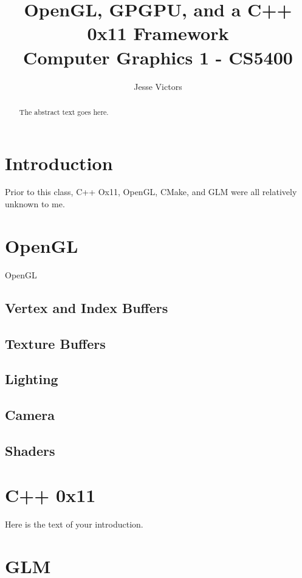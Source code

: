 \documentclass[journal]{IEEEtran}
\begin{document}
\title{OpenGL, GPGPU, and a C++ 0x11 Framework \\ \Large Computer Graphics 1 - CS5400}
\author{Jesse Victors}

\maketitle

\begin{abstract}
The abstract text goes here.
\end{abstract}

\section{Introduction}

Prior to this class, C++ Ox11, OpenGL, CMake, and GLM were all relatively unknown to me.

\section{OpenGL}

OpenGL

\subsection{Vertex and Index Buffers}

\subsection{Texture Buffers}

\subsection{Lighting}

\subsection{Camera}

\subsection{Shaders}

\section{C++ 0x11}
Here is the text of your introduction.

\section{GLM}
\end{document}
